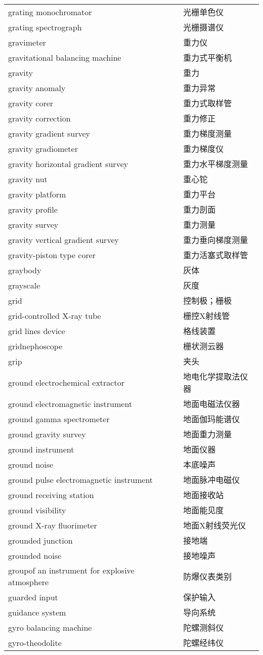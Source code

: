 \documentclass[
]{article}
\begin{document}
\begin{longtable}[]{@{}ll@{}}
grating monochromator & 光栅单色仪 \\
grating spectrograph & 光栅摄谱仪 \\
gravimeter & 重力仪 \\
gravitational balancing machine & 重力式平衡机 \\
gravity & 重力 \\
gravity anomaly & 重力异常 \\
gravity corer & 重力式取样管 \\
gravity correction & 重力修正 \\
gravity gradient survey & 重力梯度测量 \\
gravity gradiometer & 重力梯度仪 \\
gravity horizontal gradient survey & 重力水平梯度测量 \\
gravity nut & 重心铊 \\
gravity platform & 重力平台 \\
gravity profile & 重力剖面 \\
gravity survey & 重力测量 \\
gravity vertical gradient survey & 重力垂向梯度测量 \\
gravity-piston type corer & 重力活塞式取样管 \\
graybody & 灰体 \\
grayscale & 灰度 \\
grid & 控制极；栅极 \\
grid-controlled X-ray tube & 栅控X射线管 \\
grid lines device & 格线装置 \\
gridnephoscope & 栅状测云器 \\
grip & 夹头 \\
ground electrochemical extractor & 地电化学提取法仪器 \\
ground electromagnetic instrument & 地面电磁法仪器 \\
ground gamma spectrometer & 地面伽玛能谱仪 \\
ground gravity survey & 地面重力测量 \\
ground instrument & 地面仪器 \\
ground noise & 本底噪声 \\
ground pulse electromagnetic instrument & 地面脉冲电磁仪 \\
ground receiving station & 地面接收站 \\
ground visibility & 地面能见度 \\
ground X-ray fluorimeter & 地面X射线荧光仪 \\
grounded junction & 接地端 \\
grounded noise & 接地噪声 \\
groupof an instrument for explosive atmosphere & 防爆仪表类别 \\
guarded input & 保护输入 \\
guidance system & 导向系统 \\
gyro balancing machine & 陀螺测斜仪 \\
gyro-theodolite & 陀螺经纬仪 \\
\bottomrule()
\end{longtable}
\end{document}
